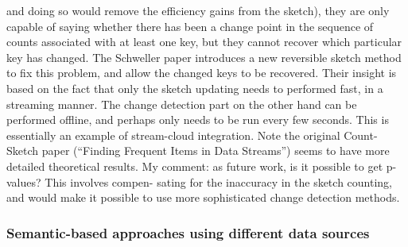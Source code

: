 \documentclass[a4paper,12pt,twoside]{report}
\begin{document}
and doing so would remove the efficiency gains from the sketch), they are only capable
of  saying whether there  has been  a  change  point  in  the sequence  of  counts  associated
with at least one key, but they cannot recover which particular key has changed.  The
Schweller paper introduces a new reversible sketch method to fix this problem, and allow
the changed keys to be recovered.  Their insight is based on the fact that only the sketch
updating needs to performed fast,  in a streaming manner.  The change detection part
on the other hand can be performed offline, and perhaps only needs to be run every few
seconds.  This is essentially an example of stream-cloud integration.
Note the original Count-Sketch paper (“Finding Frequent Items in Data Streams”)
seems to have more detailed theoretical results.
My comment:  as future work, is it possible to get p-values?  This involves compen-
sating for the inaccuracy in the sketch counting, and would make it possible to use more
sophisticated change detection methods.



\subsubsection{Semantic-based approaches using different data sources}



\appendix



\end{document}
